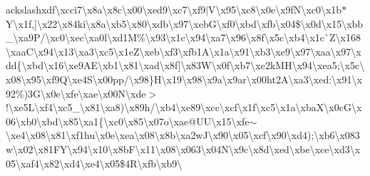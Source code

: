 \begin{DoxyCompactItemize}
ackslash{}xdf\textbackslash{}xcci7\textbackslash{}x8a\textbackslash{}x8c\textbackslash{}x00\textbackslash{}xed9\textbackslash{}xc7\textbackslash{}xf9$\vert$\+V\textbackslash{}x95\textbackslash{}xc8\textbackslash{}x0e\textbackslash{}x9f\+N\textbackslash{}xc0\textbackslash{}x1b$\ast$\+Y\textbackslash{}x1f,\mbox{]}\textbackslash{}x22\textbackslash{}x84ki\textbackslash{}x8a\textbackslash{}xb5\textbackslash{}x80\textbackslash{}xdb\textbackslash{}x97\textbackslash{}xeb\+G\textbackslash{}xf0\textbackslash{}xbd\textbackslash{}xfb\textbackslash{}x04\$\textbackslash{}x0d\textbackslash{}x15\textbackslash{}xbb\+\_\+\textbackslash{}xa9\textquotesingle{}\+P/\textbackslash{}xc0\textbackslash{}xec\textbackslash{}xa0l\textbackslash{}xd1\+M\%\textbackslash{}x93\textbackslash{}x1c\textbackslash{}x94\textbackslash{}xa7\textbackslash{}x96\textbackslash{}x8f\textbackslash{}x5c\textbackslash{}xb4\textbackslash{}x1c\`{}\+Z\textbackslash{}x168\textbackslash{}xaa\+C\textbackslash{}x94\textbackslash{}x13\textbackslash{}xa3\textbackslash{}xc5\textbackslash{}x1e\+Z\textbackslash{}xeb\textbackslash{}xf3\textbackslash{}xfb1\+A\textbackslash{}x1a\textbackslash{}x91\textbackslash{}xb3\textbackslash{}xe9\textbackslash{}x97\textbackslash{}xaa\textbackslash{}x97\textbackslash{}xdd\{\textbackslash{}xbd\textbackslash{}x16\textbackslash{}xe9\+A\+E\textbackslash{}xb1\textbackslash{}x81\textbackslash{}xad\textbackslash{}x8f\mbox{]}\textbackslash{}x83\+W\textbackslash{}x0f\textbackslash{}xb7\textbackslash{}xe2\textquotesingle{}k\+M\+H\textbackslash{}x94\textbackslash{}xea5;\textbackslash{}x5c\textbackslash{}x08\textbackslash{}x95\textbackslash{}xf9\+Q\textbackslash{}xe4\+S\textbackslash{}x00pp/\textbackslash{}x98\}\+H\textbackslash{}x19\textbackslash{}x98\textbackslash{}x9a\textbackslash{}x9ar\textbackslash{}x00ht2\+A\textbackslash{}xa3\textbackslash{}xed\+:\textbackslash{}x91\textbackslash{}x92\%)3\+G\textbackslash{}x0e\textbackslash{}xfe\textbackslash{}xae\textbackslash{}x00\+N\textbackslash{}xde$>$!\textbackslash{}xe5\+L\textbackslash{}xf4\textbackslash{}xc5\+\_\+\textbackslash{}x81\textbackslash{}xa8)\textbackslash{}x89h/\textbackslash{}xb4\textbackslash{}xe89\textbackslash{}xcc\textbackslash{}xcf\textbackslash{}x1f\textbackslash{}xc5\textbackslash{}x1a\textbackslash{}xba\+X\textbackslash{}x0c\+G\textbackslash{}x06\textbackslash{}xb0\textbackslash{}xbd\textbackslash{}x85\textbackslash{}xa1\{\textbackslash{}xc0\textbackslash{}x85\textbackslash{}x07o\textbackslash{}xae@\+U\+U\textbackslash{}x15\textbackslash{}xfe$\sim$\textbackslash{}xe4\textbackslash{}x08\textbackslash{}x81\textbackslash{}xf1hu\textbackslash{}x0e\textbackslash{}xea\textbackslash{}x08\textbackslash{}x8b\textbackslash{}xa2w\+J\textbackslash{}x90\textbackslash{}x05\textbackslash{}xcf\textbackslash{}x90\textbackslash{}xd4);\textbackslash{}xb6\textbackslash{}x083w\textbackslash{}x02\textbackslash{}x81\+F\+Y\textbackslash{}x94\textbackslash{}x10\textbackslash{}x8b\+F\textbackslash{}x11\textbackslash{}x08\textbackslash{}x063\textbackslash{}x04\+N\textbackslash{}x9c\textbackslash{}x8d\textbackslash{}xed\textbackslash{}xbe\textbackslash{}xce\textbackslash{}xd3\textbackslash{}x05\textbackslash{}xaf4\textbackslash{}x82\textbackslash{}xd4\textbackslash{}xe4\textbackslash{}x05\$4\+R\textbackslash{}xfb\textbackslash{}xb9\textbackslash
\end{DoxyCompactItemize}
